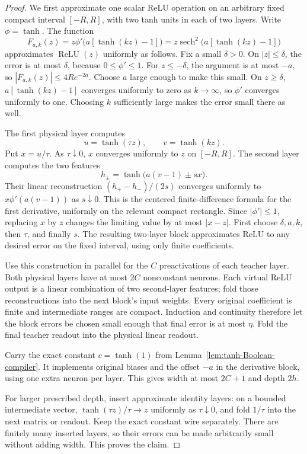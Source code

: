 \begin{proof}
We first approximate one scalar ReLU operation on an arbitrary fixed compact interval $[-R,R]$, with two tanh units in each of two layers. Write $\phi=\tanh$. The function
\[
 F_{a,k}(z)=z\phi'\big(a[\tanh(kz)-1]\big)
          =z\operatorname{sech}^2\big(a[\tanh(kz)-1]\big)
\]
approximates $\operatorname{ReLU}(z)$ uniformly as follows. Fix a small $\delta>0$. On $|z|\le\delta$, the error is at most $\delta$, because $0\le\phi'\le1$. For $z\le-\delta$, the argument is at most $-a$, so $|F_{a,k}(z)|\le4Re^{-2a}$. Choose $a$ large enough to make this small. On $z\ge\delta$, $a[\tanh(kz)-1]$ converges uniformly to zero as $k\to\infty$, so $\phi'$ converges uniformly to one. Choosing $k$ sufficiently large makes the error small there as well.

The first physical layer computes
\[
 u=\tanh(\tau z),\qquad v=\tanh(kz).
\]
Put $x=u/\tau$. As $\tau\downarrow0$, $x$ converges uniformly to $z$ on $[-R,R]$. The second layer computes the two features
\[
 h_\pm=\tanh\big(a(v-1)\pm s x\big).
\]
Their linear reconstruction $(h_+-h_-)/(2s)$ converges uniformly to
$x\phi'(a(v-1))$ as $s\downarrow0$. This is the centered finite-difference formula for the first derivative, uniformly on the relevant compact rectangle. Since $|\phi'|\le1$, replacing $x$ by $z$ changes the limiting value by at most $|x-z|$. First choose $\delta,a,k$, then $\tau$, and finally $s$. The resulting two-layer block approximates ReLU to any desired error on the fixed interval, using only finite coefficients.

Use this construction in parallel for the $C$ preactivations of each teacher layer. Both physical layers have at most $2C$ nonconstant neurons. Each virtual ReLU output is a linear combination of two second-layer features; fold those reconstructions into the next block's input weights. Every original coefficient is finite and intermediate ranges are compact. Induction and continuity therefore let the block errors be chosen small enough that final error is at most $\eta$. Fold the final teacher readout into the physical linear readout.

Carry the exact constant $c=\tanh(1)$ from Lemma~\ref{lem:tanh-Boolean-compiler}. It implements original biases and the offset $-a$ in the derivative block, using one extra neuron per layer. This gives width at most $2C+1$ and depth $2h$.

For larger prescribed depth, insert approximate identity layers: on a bounded intermediate vector, $\tanh(\tau z)/\tau\to z$ uniformly as $\tau\downarrow0$, and fold $1/\tau$ into the next matrix or readout. Keep the exact constant wire separately. There are finitely many inserted layers, so their errors can be made arbitrarily small without adding width. This proves the claim.
\end{proof}

